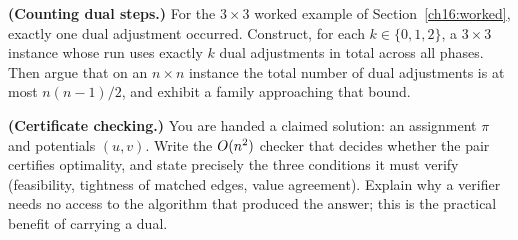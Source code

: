\begin{exercise}
\textbf{(Counting dual steps.)} For the $3\times3$ worked example of Section~\ref{ch16:worked}, exactly one dual adjustment occurred. Construct, for each $k\in\{0,1,2\}$, a $3\times3$ instance whose run uses exactly $k$ dual adjustments in total across all phases. Then argue that on an $n\times n$ instance the total number of dual adjustments is at most $n(n-1)/2$, and exhibit a family approaching that bound.
\end{exercise}

\begin{exercise}
\textbf{(Certificate checking.)} You are handed a claimed solution: an assignment $\pi$ and potentials $(u,v)$. Write the $O(n^2)$ checker that decides whether the pair certifies optimality, and state precisely the three conditions it must verify (feasibility, tightness of matched edges, value agreement). Explain why a verifier needs no access to the algorithm that produced the answer; this is the practical benefit of carrying a dual.
\end{exercise}
